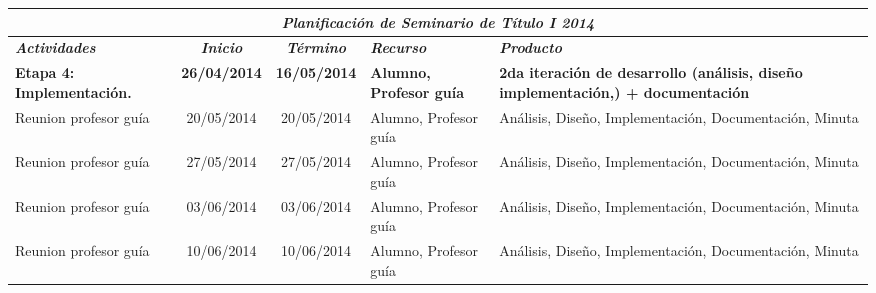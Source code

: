 \documentclass[12pt,letterpaper]{article}
\begin{document}
\begin{table}[htf]
\begin{tabular}{| p{4cm} | c | c | p{3cm}  | p{2.5cm} |}
\hline

\multicolumn{5}{|c|}{\textbf{\textit{Planificaci\'on de Seminario de T\'itulo I 2014}}} \\ \hline \hline
\textit{\textbf{Actividades}} & 
\textit{\textbf{Inicio}} & 
\textit{\textbf{T\'ermino}} & 
\centering \textit{\textbf{Recurso}} & 
\textit{\textbf{Producto}} \\ \hline \hline
\textbf{Etapa 4: Implementaci\'on.} & 
\textbf{26/04/2014} & 
\textbf{16/05/2014} & 
\textbf{Alumno, Profesor gu\'ia} & 
\textbf{2da  iteraci\'on de desarrollo (an\'alisis, dise\~no implementaci\'on,) + documentaci\'on} \\ \hline


Reunion profesor gu\'ia & 
20/05/2014 & 
20/05/2014 &  
Alumno, Profesor gu\'ia & 
An\'alisis, Dise\~no, Implementaci\'on, Documentaci\'on, Minuta\\ \hline

Reunion profesor gu\'ia & 
27/05/2014 & 
27/05/2014 &  
Alumno, Profesor gu\'ia & 
An\'alisis, Dise\~no, Implementaci\'on, Documentaci\'on, Minuta\\ \hline

Reunion profesor gu\'ia & 
03/06/2014 & 
03/06/2014 &  
Alumno, Profesor gu\'ia & 
An\'alisis, Dise\~no, Implementaci\'on, Documentaci\'on, Minuta\\ \hline

Reunion profesor gu\'ia & 
10/06/2014 & 
10/06/2014 &  
Alumno, Profesor gu\'ia & 
An\'alisis, Dise\~no, Implementaci\'on, Documentaci\'on, Minuta\\ \hline

\hline
\end{tabular}

\end{table}



\newpage
\clearpage
\end{document}
